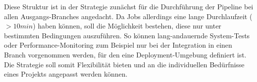 Diese Struktur ist in der Strategie zunächst für die Durchführung der Pipeline bei allen Ausgangs-Branches angedacht.
Da Jobs allerdings eine lange Durchlaufzeit ($> 10min$) haben können, soll die Möglichkeit bestehen, diese nur unter
bestimmten Bedingungen auszuführen.
So können lang-andauernde System-Tests oder Performance-Monitoring zum Beispiel nur bei der Integration in einen Branch
vorgenommen werden, für den eine Deployment-Umgebung definiert ist.
Die Strategie soll somit Flexibilität bieten und an die individuellen Bedürfnisse eines Projekts angepasst werden
können.

\clearpage
